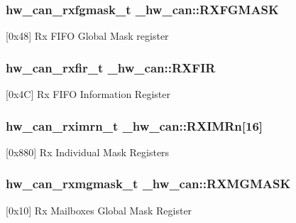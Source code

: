 \subsubsection[{\texorpdfstring{R\+X\+F\+G\+M\+A\+SK}{RXFGMASK}}]{ {\bf hw\+\_\+can\+\_\+rxfgmask\+\_\+t} \+\_\+hw\+\_\+can\+::\+R\+X\+F\+G\+M\+A\+SK}\hypertarget{struct__hw__can_a5320905a69370953702092a3d896f9a7}{}\label{struct__hw__can_a5320905a69370953702092a3d896f9a7}
\mbox{[}0x48\mbox{]} Rx F\+I\+FO Global Mask register 
\subsubsection[{\texorpdfstring{R\+X\+F\+IR}{RXFIR}}]{ {\bf hw\+\_\+can\+\_\+rxfir\+\_\+t} \+\_\+hw\+\_\+can\+::\+R\+X\+F\+IR}\hypertarget{struct__hw__can_a0b99664e454131fb1ae7eb215314796f}{}\label{struct__hw__can_a0b99664e454131fb1ae7eb215314796f}
\mbox{[}0x4C\mbox{]} Rx F\+I\+FO Information Register 
\subsubsection[{\texorpdfstring{R\+X\+I\+M\+Rn}{RXIMRn}}]{ {\bf hw\+\_\+can\+\_\+rximrn\+\_\+t} \+\_\+hw\+\_\+can\+::\+R\+X\+I\+M\+Rn\mbox{[}16\mbox{]}}\hypertarget{struct__hw__can_ada839c659f3d115d859c15d64e44c8bb}{}\label{struct__hw__can_ada839c659f3d115d859c15d64e44c8bb}
\mbox{[}0x880\mbox{]} Rx Individual Mask Registers 
\subsubsection[{\texorpdfstring{R\+X\+M\+G\+M\+A\+SK}{RXMGMASK}}]{ {\bf hw\+\_\+can\+\_\+rxmgmask\+\_\+t} \+\_\+hw\+\_\+can\+::\+R\+X\+M\+G\+M\+A\+SK}\hypertarget{struct__hw__can_a0863d976207724fce26cf8b2dfdcc652}{}\label{struct__hw__can_a0863d976207724fce26cf8b2dfdcc652}
\mbox{[}0x10\mbox{]} Rx Mailboxes Global Mask Register 
